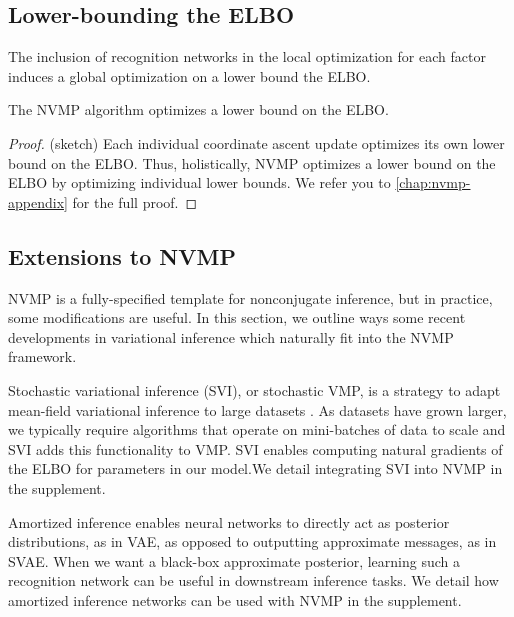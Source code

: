 \subsection{Lower-bounding the ELBO}
The inclusion of recognition networks
in the local optimization for each factor
induces a global
optimization on a lower bound the ELBO. 

\begin{theorem}
\label{thm:lowerbound}
The NVMP algorithm optimizes a lower bound on the ELBO.
\begin{proof}
 (sketch) Each individual coordinate ascent update optimizes its own lower bound on the ELBO. Thus, holistically, NVMP optimizes a lower bound on the ELBO by optimizing individual lower bounds. We refer you to \autoref{chap:nvmp-appendix} for the full proof.
\end{proof}
\end{theorem}

\subsection{Extensions to NVMP}
\label{sec:extensions}

NVMP is a fully-specified template 
for nonconjugate inference, but in practice,
some modifications are useful. In this section,
we outline ways some recent
developments in variational inference which naturally fit
into the NVMP framework.

Stochastic variational inference (SVI), or stochastic VMP, is
a strategy to adapt mean-field variational inference
to large datasets \citep{Hoffman2013}. As datasets
have grown larger, we typically require
algorithms that operate on mini-batches
of data to scale and SVI adds this functionality to VMP. 
SVI enables computing natural gradients of the ELBO for parameters in our model.We detail integrating SVI into NVMP in the supplement.


Amortized inference enables neural networks
to directly act as posterior distributions, as in VAE, as opposed to outputting approximate messages, as in SVAE. When we want a black-box approximate posterior, learning such a recognition network can be useful in downstream inference tasks. We detail how 
amortized inference networks can be used with NVMP in the supplement.

